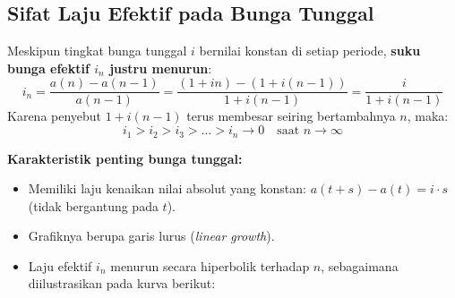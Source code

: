 \documentclass[11pt,a4paper]{article}
\begin{document}
\subsection{Sifat Laju Efektif pada Bunga Tunggal}
Meskipun tingkat bunga tunggal $i$ bernilai konstan di setiap periode, \textbf{suku bunga efektif $i_n$ justru menurun}:
\begin{equation}
    i_n = \frac{a(n) - a(n-1)}{a(n-1)} = \frac{(1 + in) - (1 + i(n-1))}{1 + i(n-1)} = \frac{i}{1 + i(n-1)}
\end{equation}
Karena penyebut $1 + i(n-1)$ terus membesar seiring bertambahnya $n$, maka:
\begin{equation*}
    i_1 > i_2 > i_3 > \dots > i_n \to 0 \quad \text{saat } n \to \infty
\end{equation*}

\textbf{Karakteristik penting bunga tunggal:}
\begin{itemize}
    \item Memiliki laju kenaikan nilai absolut yang konstan: $a(t+s) - a(t) = i \cdot s$ (tidak bergantung pada $t$).
    \item Grafiknya berupa garis lurus (\textit{linear growth}).
    \item Laju efektif $i_n$ menurun secara hiperbolik terhadap $n$, sebagaimana diilustrasikan pada kurva berikut:
\end{itemize}

\begin{center}
\end{center}
\end{document}
